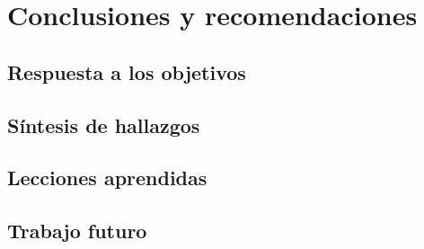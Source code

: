 \section{Conclusiones y recomendaciones}
\label{sec:conclusiones}

\subsection{Respuesta a los objetivos}

\subsection{Síntesis de hallazgos}

\subsection{Lecciones aprendidas}

\subsection{Trabajo futuro}
